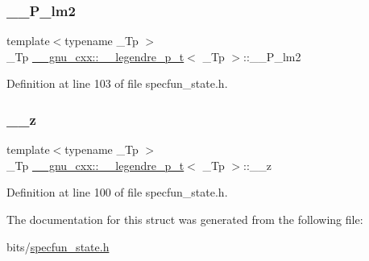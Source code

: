 \subsubsection{\texorpdfstring{\+\_\+\+\_\+\+P\+\_\+lm2}{\_\_P\_lm2}}
{\footnotesize\ttfamily template$<$typename \+\_\+\+Tp $>$ \\
\+\_\+\+Tp \hyperlink{struct____gnu__cxx_1_1____legendre__p__t}{\+\_\+\+\_\+gnu\+\_\+cxx\+::\+\_\+\+\_\+legendre\+\_\+p\+\_\+t}$<$ \+\_\+\+Tp $>$\+::\+\_\+\+\_\+\+P\+\_\+lm2}



Definition at line 103 of file specfun\+\_\+state.\+h.

\mbox{\label{struct____gnu__cxx_1_1____legendre__p__t_ad1ee2ca27099d0f3c75220247a0779f6}} 
\subsubsection{\texorpdfstring{\+\_\+\+\_\+z}{\_\_z}}
{\footnotesize\ttfamily template$<$typename \+\_\+\+Tp $>$ \\
\+\_\+\+Tp \hyperlink{struct____gnu__cxx_1_1____legendre__p__t}{\+\_\+\+\_\+gnu\+\_\+cxx\+::\+\_\+\+\_\+legendre\+\_\+p\+\_\+t}$<$ \+\_\+\+Tp $>$\+::\+\_\+\+\_\+z}



Definition at line 100 of file specfun\+\_\+state.\+h.



The documentation for this struct was generated from the following file\+:\begin{DoxyCompactItemize}
\item 
bits/\hyperlink{specfun__state_8h}{specfun\+\_\+state.\+h}\end{DoxyCompactItemize}
